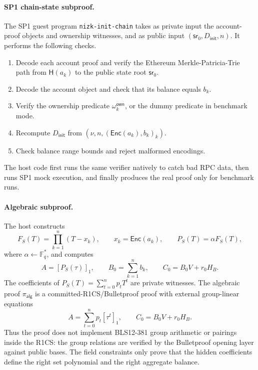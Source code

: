 \documentclass[UTF8,a4paper,11pt]{ctexart}
\newcommand{\F}{\mathbb F}
\newcommand{\Hash}{\mathsf H}
\newcommand{\Enc}{\mathsf{Enc}}
\newcommand{\sr}{\mathsf{sr}}
\begin{document}
\paragraph{SP1 chain-state subproof.}
The SP1 guest program \texttt{nizk-init-chain} takes as private input the account-proof objects and
ownership witnesses, and as public input $(\sr_0,D_{\mathsf{init}},n)$.  It performs the following
checks.
\begin{enumerate}[leftmargin=2em]
  \item Decode each account proof and verify the Ethereum Merkle-Patricia-Trie path from
        $\Hash(a_k)$ to the public state root $\sr_0$.
  \item Decode the account object and check that its balance equals $b_k$.
  \item Verify the ownership predicate $\omega^{\mathsf{own}}_k$, or the dummy predicate in
        benchmark mode.
  \item Recompute $D_{\mathsf{init}}$ from $(\nu,n,(\Enc(a_k),b_k)_k)$.
  \item Check balance range bounds and reject malformed encodings.
\end{enumerate}
The host code first runs the same verifier natively to catch bad RPC data, then runs SP1 mock
execution, and finally produces the real proof only for benchmark runs.

\paragraph{Algebraic subproof.}
The host constructs
\[
  F_S(T)=\prod_{k=1}^{n}(T-x_k),\qquad x_k=\Enc(a_k),\qquad
  P_S(T)=\alpha F_S(T),
\]
where $\alpha\leftarrow\F_q^*$, and computes
\[
  A=[P_S(\tau)]_1,
  \qquad
  B_0=\sum_{k=1}^{n} b_k,
  \qquad
  C_0=B_0V+r_0H_B.
\]
The coefficients of $P_S(T)=\sum_{t=0}^{n}p_tT^t$ are private witnesses.  The algebraic proof
$\pi_{\mathsf{alg}}$ is a committed-R1CS/Bulletproof proof with external group-linear equations
\[
  A=\sum_{t=0}^{n}p_t[\tau^t]_1,
  \qquad
  C_0=B_0V+r_0H_B.
\]
Thus the proof does not implement BLS12-381 group arithmetic or pairings inside the R1CS: the group
relations are verified by the Bulletproof opening layer against public bases.  The field constraints
only prove that the hidden coefficients define the right set polynomial and the right aggregate
balance.
\end{document}
